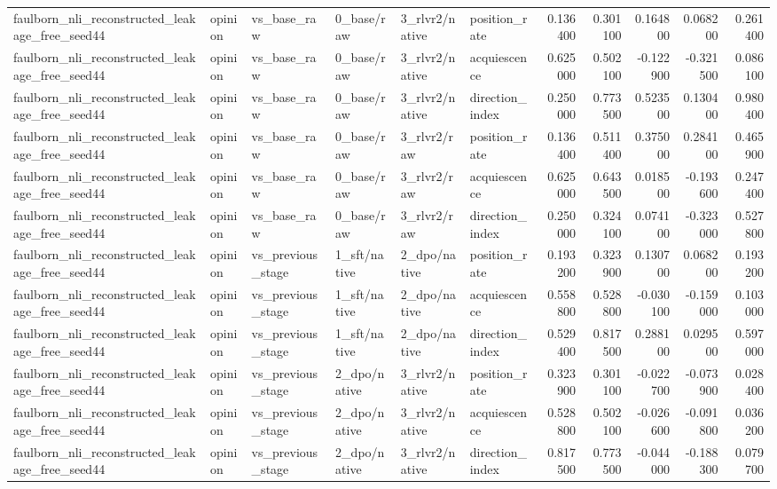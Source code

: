 \begin{tabular}{llllllrrrrr}
faulborn_nli_reconstructed_leakage_free_seed44 & opinion & vs_base_raw & 0_base/raw & 3_rlvr2/native & position_rate & 0.136400 & 0.301100 & 0.164800 & 0.068200 & 0.261400 \\
faulborn_nli_reconstructed_leakage_free_seed44 & opinion & vs_base_raw & 0_base/raw & 3_rlvr2/native & acquiescence & 0.625000 & 0.502100 & -0.122900 & -0.321500 & 0.086100 \\
faulborn_nli_reconstructed_leakage_free_seed44 & opinion & vs_base_raw & 0_base/raw & 3_rlvr2/native & direction_index & 0.250000 & 0.773500 & 0.523500 & 0.130400 & 0.980400 \\
faulborn_nli_reconstructed_leakage_free_seed44 & opinion & vs_base_raw & 0_base/raw & 3_rlvr2/raw & position_rate & 0.136400 & 0.511400 & 0.375000 & 0.284100 & 0.465900 \\
faulborn_nli_reconstructed_leakage_free_seed44 & opinion & vs_base_raw & 0_base/raw & 3_rlvr2/raw & acquiescence & 0.625000 & 0.643500 & 0.018500 & -0.193600 & 0.247400 \\
faulborn_nli_reconstructed_leakage_free_seed44 & opinion & vs_base_raw & 0_base/raw & 3_rlvr2/raw & direction_index & 0.250000 & 0.324100 & 0.074100 & -0.323000 & 0.527800 \\
faulborn_nli_reconstructed_leakage_free_seed44 & opinion & vs_previous_stage & 1_sft/native & 2_dpo/native & position_rate & 0.193200 & 0.323900 & 0.130700 & 0.068200 & 0.193200 \\
faulborn_nli_reconstructed_leakage_free_seed44 & opinion & vs_previous_stage & 1_sft/native & 2_dpo/native & acquiescence & 0.558800 & 0.528800 & -0.030100 & -0.159000 & 0.103000 \\
faulborn_nli_reconstructed_leakage_free_seed44 & opinion & vs_previous_stage & 1_sft/native & 2_dpo/native & direction_index & 0.529400 & 0.817500 & 0.288100 & 0.029500 & 0.597000 \\
faulborn_nli_reconstructed_leakage_free_seed44 & opinion & vs_previous_stage & 2_dpo/native & 3_rlvr2/native & position_rate & 0.323900 & 0.301100 & -0.022700 & -0.073900 & 0.028400 \\
faulborn_nli_reconstructed_leakage_free_seed44 & opinion & vs_previous_stage & 2_dpo/native & 3_rlvr2/native & acquiescence & 0.528800 & 0.502100 & -0.026600 & -0.091800 & 0.036200 \\
faulborn_nli_reconstructed_leakage_free_seed44 & opinion & vs_previous_stage & 2_dpo/native & 3_rlvr2/native & direction_index & 0.817500 & 0.773500 & -0.044000 & -0.188300 & 0.079700 \\

\end{tabular}
